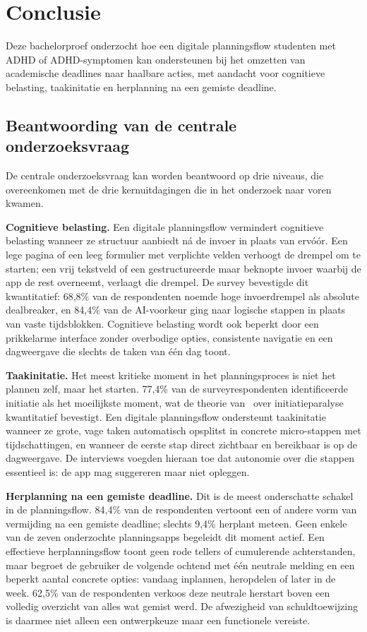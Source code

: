 \chapter{Conclusie}%
\label{ch:conclusie}

Deze bachelorproef onderzocht hoe een digitale planningsflow studenten met ADHD
of ADHD-symptomen kan ondersteunen bij het omzetten van academische deadlines
naar haalbare acties, met aandacht voor cognitieve belasting, taakinitatie en
herplanning na een gemiste deadline.

\section{Beantwoording van de centrale onderzoeksvraag}

De centrale onderzoeksvraag kan worden beantwoord op drie niveaus, die
overeenkomen met de drie kernuitdagingen die in het onderzoek naar voren kwamen.

\textbf{Cognitieve belasting.}
Een digitale planningsflow vermindert cognitieve belasting wanneer ze structuur
aanbiedt ná de invoer in plaats van ervóór. Een lege pagina of een leeg formulier
met verplichte velden verhoogt de drempel om te starten; een vrij tekstveld of
een gestructureerde maar beknopte invoer waarbij de app de rest overneemt, verlaagt
die drempel. De survey bevestigde dit kwantitatief: 68,8\% van de respondenten
noemde hoge invoerdrempel als absolute dealbreaker, en 84,4\% van de AI-voorkeur
ging naar logische stappen in plaats van vaste tijdsblokken. Cognitieve
belasting wordt ook beperkt door een prikkelarme interface zonder overbodige
opties, consistente navigatie en een dagweergave die slechts de taken van één
dag toont.

\textbf{Taakinitatie.}
Het meest kritieke moment in het planningsproces is niet het plannen zelf, maar
het starten. 77,4\% van de surveyrespondenten identificeerde initiatie als het
moeilijkste moment, wat de theorie van~\textcite{Barkley2022} over
initiatieparalyse kwantitatief bevestigt. Een digitale planningsflow ondersteunt
taakinitatie wanneer ze grote, vage taken automatisch opsplitst in concrete
micro-stappen met tijdschattingen, en wanneer de eerste stap direct zichtbaar en
bereikbaar is op de dagweergave. De interviews voegden hieraan toe dat autonomie
over die stappen essentieel is: de app mag suggereren maar niet opleggen.

\textbf{Herplanning na een gemiste deadline.}
Dit is de meest onderschatte schakel in de planningsflow. 84,4\% van de
respondenten vertoont een of andere vorm van vermijding na een gemiste deadline;
slechts 9,4\% herplant meteen. Geen enkele van de zeven onderzochte
planningsapps begeleidt dit moment actief. Een effectieve herplanningsflow
toont geen rode tellers of cumulerende achterstanden, maar begroet de gebruiker
de volgende ochtend met één neutrale melding en een beperkt aantal concrete
opties: vandaag inplannen, heropdelen of later in de week. 62,5\% van de
respondenten verkoos deze neutrale herstart boven een volledig overzicht van
alles wat gemist werd. De afwezigheid van schuldtoewijzing is daarmee niet
alleen een ontwerpkeuze maar een functionele vereiste.

